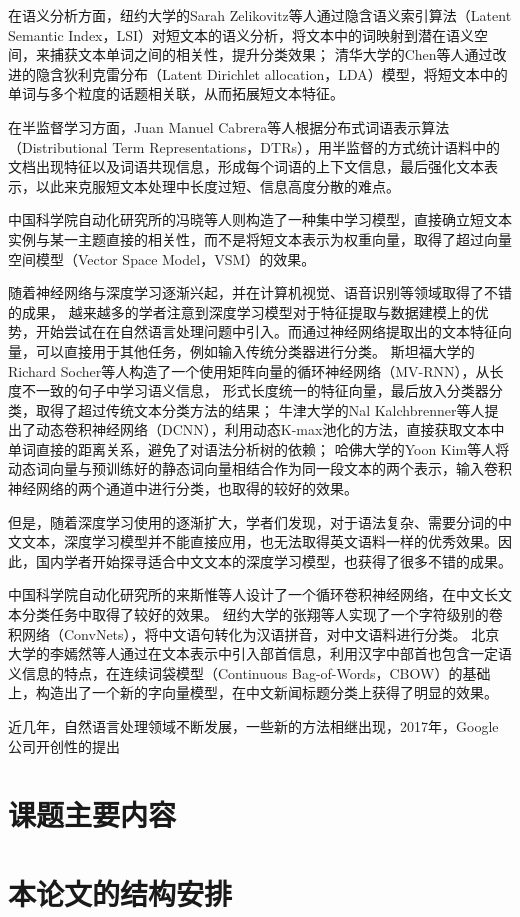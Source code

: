 在语义分析方面，纽约大学的Sarah Zelikovitz等人通过隐含语义索引算法（Latent Semantic Index，LSI）对短文本的语义分析，将文本中的词映射到潜在语义空间，来捕获文本单词之间的相关性，提升分类效果；
清华大学的Chen等人通过改进的隐含狄利克雷分布（Latent Dirichlet allocation，LDA）模型，将短文本中的单词与多个粒度的话题相关联，从而拓展短文本特征。

在半监督学习方面，Juan Manuel Cabrera等人根据分布式词语表示算法（Distributional Term Representations，DTRs），用半监督的方式统计语料中的文档出现特征以及词语共现信息，形成每个词语的上下文信息，最后强化文本表示，以此来克服短文本处理中长度过短、信息高度分散的难点。

中国科学院自动化研究所的冯晓等人则构造了一种集中学习模型，直接确立短文本实例与某一主题直接的相关性，而不是将短文本表示为权重向量，取得了超过向量空间模型（Vector Space Model，VSM）的效果。

随着神经网络与深度学习逐渐兴起，并在计算机视觉、语音识别等领域取得了不错的成果，
越来越多的学者注意到深度学习模型对于特征提取与数据建模上的优势，开始尝试在在自然语言处理问题中引入。而通过神经网络提取出的文本特征向量，可以直接用于其他任务，例如输入传统分类器进行分类。
斯坦福大学的Richard Socher等人构造了一个使用矩阵向量的循环神经网络（MV-RNN），从长度不一致的句子中学习语义信息，
形式长度统一的特征向量，最后放入分类器分类，取得了超过传统文本分类方法的结果；
牛津大学的Nal Kalchbrenner等人提出了动态卷积神经网络（DCNN），利用动态K-max池化的方法，直接获取文本中单词直接的距离关系，避免了对语法分析树的依赖；
哈佛大学的Yoon Kim等人将动态词向量与预训练好的静态词向量相结合作为同一段文本的两个表示，输入卷积神经网络的两个通道中进行分类，也取得的较好的效果。

但是，随着深度学习使用的逐渐扩大，学者们发现，对于语法复杂、需要分词的中文文本，深度学习模型并不能直接应用，也无法取得英文语料一样的优秀效果。因此，国内学者开始探寻适合中文文本的深度学习模型，也获得了很多不错的成果。

中国科学院自动化研究所的来斯惟等人设计了一个循环卷积神经网络，在中文长文本分类任务中取得了较好的效果。
纽约大学的张翔等人实现了一个字符级别的卷积网络（ConvNets），将中文语句转化为汉语拼音，对中文语料进行分类。
北京大学的李嫣然等人通过在文本表示中引入部首信息，利用汉字中部首也包含一定语义信息的特点，在连续词袋模型（Continuous Bag-of-Words，CBOW）的基础上，构造出了一个新的字向量模型，在中文新闻标题分类上获得了明显的效果。

近几年，自然语言处理领域不断发展，一些新的方法相继出现，2017年，Google公司开创性的提出
\section{课题主要内容}
\section{本论文的结构安排}
